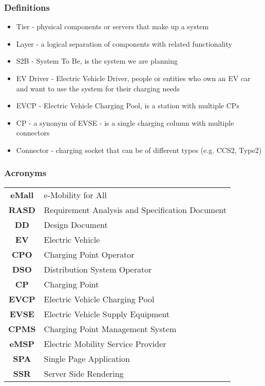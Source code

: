 \subsubsection{Definitions}
\begin{itemize}
    \item Tier -  physical components or servers that make up a system
    \item Layer - a logical separation of components with related functionality
    \item S2B - System To Be, is the system we are planning
    \item EV Driver - Electric Vehicle Driver, people or entities who own an EV car and want to use the
          system for their charging needs
    \item EVCP - Electric Vehicle Charging Pool, is a station with multiple CPs
    \item CP - a synonym of EVSE - is a single charging column with multiple connectors
    \item  Connector - charging socket that can be of different types (e.g. CCS2, Type2)
\end{itemize}

\subsubsection{Acronyms}
\begin{table}[H]
    \begin{tabularx}{\textwidth}{cX}
        \toprule
        \textbf{eMall} & e-Mobility for All                              \\
        \textbf{RASD}  & Requirement Analysis and Specification Document \\
        \textbf{DD}    & Design Document                                 \\
        \textbf{EV}    & Electric Vehicle                                \\
        \textbf{CPO}   & Charging Point Operator                         \\
        \textbf{DSO}   & Distribution System Operator                    \\
        \textbf{CP}    & Charging Point                                  \\
        \textbf{EVCP}  & Electric Vehicle Charging Pool                  \\
        \textbf{EVSE}  & Electric Vehicle Supply Equipment               \\
        \textbf{CPMS}  & Charging Point Management System                \\
        \textbf{eMSP}  & Electric Mobility Service Provider              \\
        \textbf{SPA}   & Single Page Application                         \\
        \textbf{SSR}   & Server Side Rendering                           \\
        \bottomrule
    \end{tabularx}
\end{table}
\vspace*{1cm}
